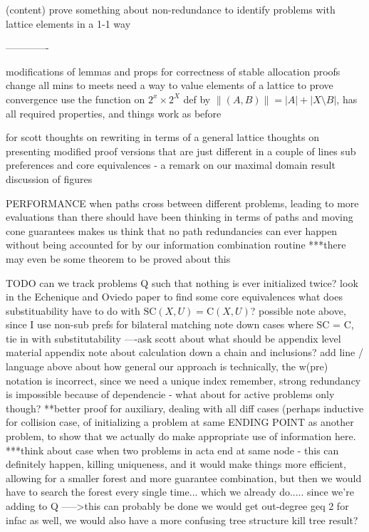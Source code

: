 \documentclass[11pt,reqno]{amsart}
\theoremstyle{definition}
\numberwithin{equation}{section}
\newcommand{\strcore}{\mathrm{SC}(X,U)}
\newcommand{\core}{\mathrm{C}(X,U)}
\begin{document}
(content)
prove something about non-redundance to identify problems with lattice elements in a 1-1 way

-------------

modifications of lemmas and props for correctness of stable allocation proofs
    change all mins to meets
    need a way to value elements of a lattice to prove convergence 
    use the function on $2^x \times 2^X$ def by $\|(A,B) \| = |A| + |X \setminus B|$, has all required properties, and things work as before

for scott 
    thoughts on rewriting in terms of a general lattice
    thoughts on presenting modified proof versions that are just different in a couple of lines
    sub preferences and core equivalences - a remark on our maximal domain result
    discussion of figures 

PERFORMANCE 
    when paths cross between different problems, leading to more evaluations than there should have been
    thinking in terms of paths and moving cone guarantees makes us think that no path redundancies can ever happen without being accounted for by our information combination routine
    ***there may even be some theorem to be proved about this


TODO
can we track problems Q such that nothing is ever initialized twice? 
look in the Echenique and Oviedo paper to find some core equivalences
what does substituability have to do with $\strcore = \core$?
    possible note above, since I use non-sub prefs for bilateral matching
note down cases where SC = C, tie in with substitutability
----ask scott about what should be appendix level material 
appendix note about calculation down a chain and inclusions?
add line / language above about how general our approach is
technically, the w(pre) notation is incorrect, since we need a unique index
remember, strong redundancy is impossible because of dependencie - what about for active problems only though?
**better proof for auxiliary, dealing with all diff cases (perhaps inductive for collision case, of initializing a problem at same ENDING POINT as another problem, to show that we actually do make appropriate use of information here.
***think about case when two problems in acta end at same node - this can definitely happen, killing uniqueness, and it would make things more efficient, allowing for a smaller forest and more guarantee combination, but then we would have to search the forest every single time... which we already do..... since we're adding to Q
    ----->this can probably be done
    we would get out-degree geq 2 for infac as well, we would also have a more confusing tree structure
    kill tree result?



\end{document}
